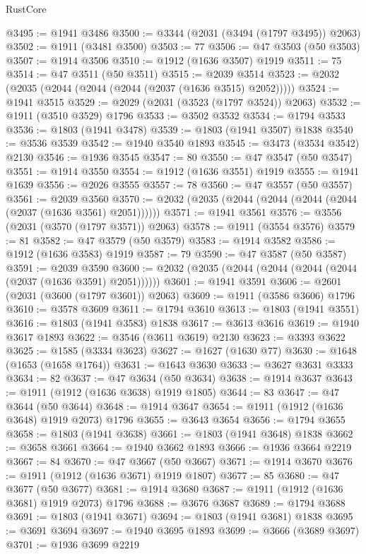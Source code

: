 \begin{lexlean}{RustCore}
\begin{coremodule}
@3495 := @1941 @3486
@3500 := @3344 (@2031 (@3494 (@1797 @3495)) @2063)
@3502 := @1911 (@3481 @3500)
@3503 := 77
@3506 := @47 @3503 (@50 @3503)
@3507 := @1914 @3506
@3510 := @1912 (@1636 @3507) @1919
@3511 := 75
@3514 := @47 @3511 (@50 @3511)
@3515 := @2039 @3514
@3523 := @2032 (@2035 (@2044 (@2044 (@2044 (@2037 (@1636 @3515) @2052)))))
@3524 := @1941 @3515
@3529 := @2029 (@2031 (@3523 (@1797 @3524)) @2063)
@3532 := @1911 (@3510 @3529) @1796
@3533 := @3502 @3532
@3534 := @1794 @3533
@3536 := @1803 (@1941 @3478)
@3539 := @1803 (@1941 @3507) @1838
@3540 := @3536 @3539
@3542 := @1940 @3540 @1893
@3545 := @3473 (@3534 @3542) @2130
@3546 := @1936 @3545
@3547 := 80
@3550 := @47 @3547 (@50 @3547)
@3551 := @1914 @3550
@3554 := @1912 (@1636 @3551) @1919
@3555 := @1941 @1639
@3556 := @2026 @3555
@3557 := 78
@3560 := @47 @3557 (@50 @3557)
@3561 := @2039 @3560
@3570 := @2032 (@2035 (@2044 (@2044 (@2044 (@2044 (@2037 (@1636 @3561) @2051))))))
@3571 := @1941 @3561
@3576 := @3556 (@2031 (@3570 (@1797 @3571)) @2063)
@3578 := @1911 (@3554 @3576)
@3579 := 81
@3582 := @47 @3579 (@50 @3579)
@3583 := @1914 @3582
@3586 := @1912 (@1636 @3583) @1919
@3587 := 79
@3590 := @47 @3587 (@50 @3587)
@3591 := @2039 @3590
@3600 := @2032 (@2035 (@2044 (@2044 (@2044 (@2044 (@2037 (@1636 @3591) @2051))))))
@3601 := @1941 @3591
@3606 := @2601 (@2031 (@3600 (@1797 @3601)) @2063)
@3609 := @1911 (@3586 @3606) @1796
@3610 := @3578 @3609
@3611 := @1794 @3610
@3613 := @1803 (@1941 @3551)
@3616 := @1803 (@1941 @3583) @1838
@3617 := @3613 @3616
@3619 := @1940 @3617 @1893
@3622 := @3546 (@3611 @3619) @2130
@3623 := @3393 @3622
@3625 := @1585 (@3334 @3623)
@3627 := @1627 (@1630 @77)
@3630 := @1648 (@1653 (@1658 @1764))
@3631 := @1643 @3630
@3633 := @3627 @3631 @3333
@3634 := 82
@3637 := @47 @3634 (@50 @3634)
@3638 := @1914 @3637
@3643 := @1911 (@1912 (@1636 @3638) @1919 @1805)
@3644 := 83
@3647 := @47 @3644 (@50 @3644)
@3648 := @1914 @3647
@3654 := @1911 (@1912 (@1636 @3648) @1919 @2073) @1796
@3655 := @3643 @3654
@3656 := @1794 @3655
@3658 := @1803 (@1941 @3638)
@3661 := @1803 (@1941 @3648) @1838
@3662 := @3658 @3661
@3664 := @1940 @3662 @1893
@3666 := @1936 @3664 @2219
@3667 := 84
@3670 := @47 @3667 (@50 @3667)
@3671 := @1914 @3670
@3676 := @1911 (@1912 (@1636 @3671) @1919 @1807)
@3677 := 85
@3680 := @47 @3677 (@50 @3677)
@3681 := @1914 @3680
@3687 := @1911 (@1912 (@1636 @3681) @1919 @2073) @1796
@3688 := @3676 @3687
@3689 := @1794 @3688
@3691 := @1803 (@1941 @3671)
@3694 := @1803 (@1941 @3681) @1838
@3695 := @3691 @3694
@3697 := @1940 @3695 @1893
@3699 := @3666 (@3689 @3697)
@3701 := @1936 @3699 @2219

\end{coremodule}
\end{lexlean}
